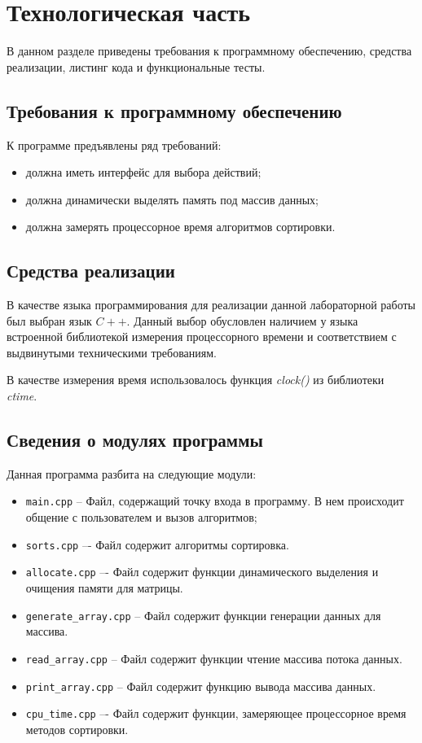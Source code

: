 \chapter{Технологическая часть}

В данном разделе приведены требования к программному обеспечению, средства реализации, листинг кода и функциональные тесты.

\section{Требования к программному обеспечению}

К программе предъявлены ряд требований:

\begin{itemize}
	\item должна иметь интерфейс для выбора действий;
	\item должна динамически выделять память под массив данных;
	\item должна замерять процессорное время алгоритмов сортировки.
\end{itemize}

\section{Средства реализации}

В качестве языка программирования для реализации данной лабораторной работы был выбран язык $C++$\cite{cpp-lang}. Данный выбор обусловлен наличием у языка
встроенной библиотекой измерения процессорного времени и соответствием с выдвинутыми техническими требованиям.

В качестве измерения время использовалось функция \textit{clock()} из библиотеки \textit{ctime}\cite{cpp-lang-time}. 

\clearpage

\section{Сведения о модулях программы}

Данная программа разбита на следующие модули:

\begin{itemize}
	\item \texttt{main.cpp} -- Файл, содержащий точку входа в программу. В нем происходит
	общение с пользователем и вызов алгоритмов;
	\item \texttt{sorts.cpp} –- Файл содержит алгоритмы сортировка.
	\item \texttt{allocate.cpp} –- Файл содержит функции динамического выделения и очищения памяти для матрицы.
	\item \texttt{generate\_array.cpp} -- Файл содержит функции генерации данных для массива.
	\item \texttt{read\_array.cpp} -- Файл содержит функции чтение массива потока данных.
	\item \texttt{print\_array.cpp} -- Файл содержит функцию вывода массива данных.
	\item \texttt{cpu\_time.cpp} –- Файл содержит функции, замеряющее процессорное время методов сортировки.
\end{itemize}

